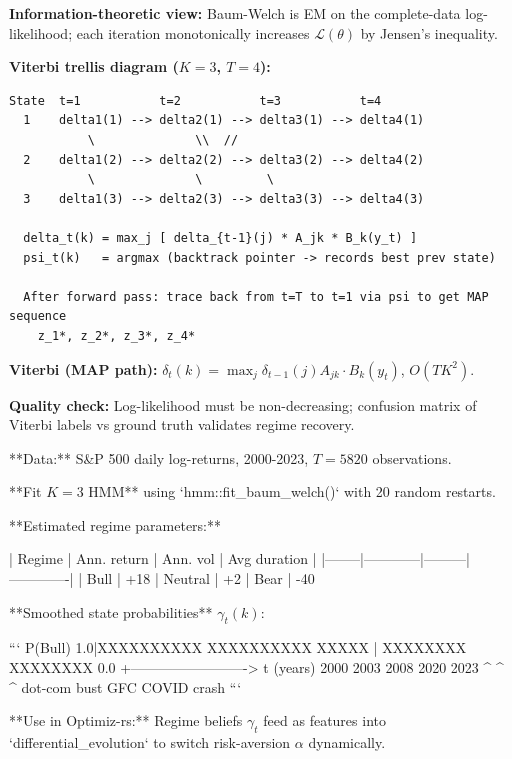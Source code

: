 \documentclass[11pt,a4paper]{article}
\begin{document}
\textbf{Information-theoretic view:} Baum-Welch is EM on the complete-data log-likelihood; each iteration monotonically increases \(\mathcal{L}(\theta)\) by Jensen's inequality.

\textbf{Viterbi trellis diagram (\(K=3\), \(T=4\)):}

\begin{verbatim}
State  t=1           t=2           t=3           t=4
  1    delta1(1) --> delta2(1) --> delta3(1) --> delta4(1)
           \              \\  //
  2    delta1(2) --> delta2(2) --> delta3(2) --> delta4(2)
           \              \         \
  3    delta1(3) --> delta2(3) --> delta3(3) --> delta4(3)

  delta_t(k) = max_j [ delta_{t-1}(j) * A_jk * B_k(y_t) ]
  psi_t(k)   = argmax (backtrack pointer -> records best prev state)

  After forward pass: trace back from t=T to t=1 via psi to get MAP sequence
    z_1*, z_2*, z_3*, z_4*
\end{verbatim}

\textbf{Viterbi (MAP path):} \(\delta_t(k) = \max_j \delta_{t-1}(j)A_{jk} \cdot B_k(y_t)\), \(O(TK^2)\).

\textbf{Quality check:} Log-likelihood must be non-decreasing; confusion matrix of Viterbi labels vs ground truth validates regime recovery.

\begin{tcolorbox}[colback=notebg!60,colframe=optgreen,fonttitle=\bfseries\sffamily,title={\textsf{\textbf{Example}} — Example — Equity Regime Detection (S&P 500)},breakable]
**Data:** S&P 500 daily log-returns, 2000-2023, $T=5820$ observations.

**Fit $K=3$ HMM** using `hmm::fit_baum_welch()` with 20 random restarts.

**Estimated regime parameters:**

| Regime | Ann. return | Ann. vol | Avg duration |
|--------|------------|---------|-------------|
| Bull   | +18%
| Neutral | +2%
| Bear   | -40%

**Smoothed state probabilities** $\gamma_t(k)$:

```
P(Bull)   1.0|XXXXXXXXXX        XXXXXXXXXX        XXXXX
              |          XXXXXXXX          XXXXXXXX
          0.0 +-------------------------> t (years)
              2000    2003    2008    2020   2023
                  ^                ^    ^
                  dot-com bust  GFC  COVID crash
```

**Use in Optimiz-rs:** Regime beliefs $\gamma_t$ feed as features into
`differential_evolution` to switch risk-aversion $\alpha$ dynamically.
\end{tcolorbox}
\end{document}
